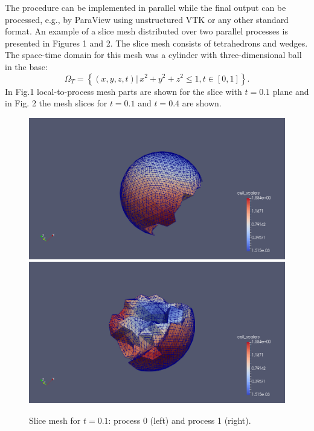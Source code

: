 \documentclass[12pt]{article}
\begin{document}
The procedure can be implemented in parallel while the final output can be processed, e.g., by ParaView \cite{paraview} using unstructured VTK \cite{vtk} or any other standard format. An example of a slice mesh distributed over two parallel processes is presented in Figures 1 and 2. The slice mesh consists of tetrahedrons and wedges. The space-time domain for this mesh was a cylinder with three-dimensional ball in the base:
$$
\Omega_T = \left\{ (x,y,z,t) | \, x^2+y^2+z^2 \leq 1, t \in [0,1]  \right\}.
$$
In Fig.1 local-to-process mesh parts are shown for the slice with $t=0.1$ plane and in Fig. 2 the mesh slices for $t = 0.1$ and $t=0.4$ are shown.

\begin{figure}[!htb]
  \includegraphics[width=\linewidth]{mesh_1part.png}
\endminipage\hfill
{}
  \includegraphics[width=\linewidth]{mesh_2part.png}
\endminipage\hfill
\caption{Slice mesh for $t = 0.1$: process 0 (left) and process 1 (right).}
\end{figure}
\end{document}
